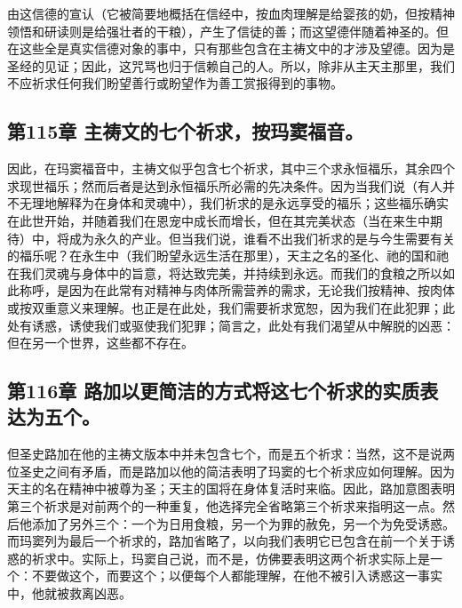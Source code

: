 由这信德的宣认（它被简要地概括在信经中，按血肉理解是给婴孩的奶，但按精神领悟和研读则是给强壮者的干粮），产生了信徒的善；而这望德伴随着神圣的。但在这些全是真实信德对象的事中，只有那些包含在主祷文中的才涉及望德。因为是圣经的见证；因此，这咒骂也归于信赖自己的人。所以，除非从主天主那里，我们不应祈求任何我们盼望善行或盼望作为善工赏报得到的事物。\par


\subsection{第115章 主祷文的七个祈求，按玛窦福音。}

因此，在玛窦福音中，主祷文似乎包含七个祈求，其中三个求永恒福乐，其余四个求现世福乐；然而后者是达到永恒福乐所必需的先决条件。因为当我们说（有人并不无理地解释为在身体和灵魂中），我们祈求的是永远享受的福乐；这些福乐确实在此世开始，并随着我们在恩宠中成长而增长，但在其完美状态（当在来生中期待）中，将成为永久的产业。但当我们说，谁看不出我们祈求的是与今生需要有关的福乐呢？在永生中（我们盼望永远生活在那里），天主之名的圣化、祂的国和祂在我们灵魂与身体中的旨意，将达致完美，并持续到永远。而我们的食粮之所以如此称呼，是因为在此常有对精神与肉体所需营养的需求，无论我们按精神、按肉体或按双重意义来理解。也正是在此处，我们需要祈求宽恕，因为我们在此犯罪；此处有诱惑，诱使我们或驱使我们犯罪；简言之，此处有我们渴望从中解脱的凶恶：但在另一个世界，这些都不存在。\par


\subsection{第116章 路加以更简洁的方式将这七个祈求的实质表达为五个。}

但圣史路加在他的主祷文版本中并未包含七个，而是五个祈求：当然，这不是说两位圣史之间有矛盾，而是路加以他的简洁表明了玛窦的七个祈求应如何理解。因为天主的名在精神中被尊为圣；天主的国将在身体复活时来临。因此，路加意图表明第三个祈求是对前两个的一种重复，他选择完全省略第三个祈求来指明这一点。然后他添加了另外三个：一个为日用食粮，另一个为罪的赦免，另一个为免受诱惑。而玛窦列为最后一个祈求的，路加省略了，以向我们表明它已包含在前一个关于诱惑的祈求中。实际上，玛窦自己说，而不是，仿佛要表明这两个祈求实际上是一个：不要做这个，而要这个；以便每个人都能理解，在他不被引入诱惑这一事实中，他就被救离凶恶。\par

